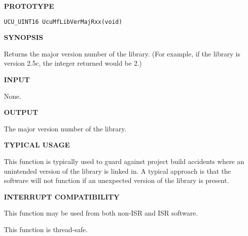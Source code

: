 \noindent\textbf{PROTOTYPE}
\begin {list}{}{\setlength{\leftmargin}{0.25in}\setlength{\topsep}{0.0in}}
\item
\begin{verbatim}
UCU_UINT16 UcuMfLibVerMajRxx(void)
\end{verbatim}
\end{list}
\vspace{2.8ex}

\noindent\textbf{SYNOPSIS}
\begin{list}{}{\setlength{\leftmargin}{0.25in}\setlength{\topsep}{0.0in}}
\item
Returns the major version number of the library.  (For example,
if the library is version 2.5c, the integer returned would be 2.)
\end{list}
\vspace{2.8ex}

\noindent\textbf{INPUT}
\begin{list}{}{\setlength{\leftmargin}{0.5in}\setlength{\itemindent}{-0.25in}\setlength{\topsep}{0.0in}\setlength{\partopsep}{0.0in}}
\item None.
\end{list}
\vspace{2.8ex}

\noindent\textbf{OUTPUT}
\begin{list}{}{\setlength{\leftmargin}{0.25in}\setlength{\topsep}{0.0in}}
\item The major version number of the library.
\end{list}
\vspace{2.8ex}

\noindent\textbf{TYPICAL USAGE}
\begin{list}{}{\setlength{\leftmargin}{0.25in}\setlength{\topsep}{0.0in}}
\item This function is typically used to guard against project build accidents
      where an unintended version of the library is linked in.  A typical
      approach is that the software will not function if an unexpected version
      of the library is present.
\end{list}
\vspace{2.8ex}

\noindent\textbf{INTERRUPT COMPATIBILITY}
\begin{list}{}{\setlength{\leftmargin}{0.25in}\setlength{\topsep}{0.0in}}
\item This function may be used from both non-ISR and ISR software.
\item This function is thread-safe.
\end{list}
\vspace{2.8ex}

